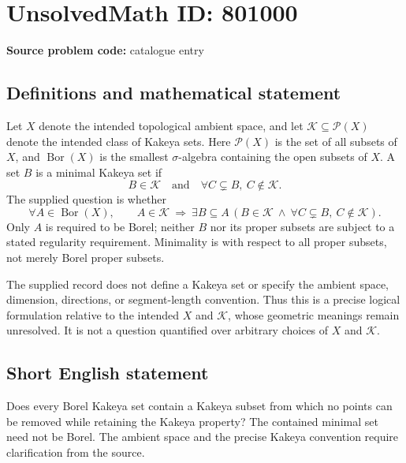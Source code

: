 \documentclass[11pt]{article}
\begin{document}
\section*{UnsolvedMath ID: 801000}
\textbf{Source problem code:} catalogue entry
\subsection{Definitions and mathematical statement}
Let \(X\) denote the intended topological ambient space, and let \(\mathcal K\subseteq\mathcal P(X)\) denote the intended class of Kakeya sets. Here \(\mathcal P(X)\) is the set of all subsets of \(X\), and \(\operatorname{Bor}(X)\) is the smallest \(\sigma\)-algebra containing the open subsets of \(X\). A set \(B\) is a minimal Kakeya set if
\[
B\in\mathcal K
\quad\text{and}\quad
\forall C\subsetneq B,\ C\notin\mathcal K.
\]
The supplied question is whether
\[
\forall A\in\operatorname{Bor}(X),\qquad
A\in\mathcal K\ \Longrightarrow\
\exists B\subseteq A\,
\left(B\in\mathcal K\ \land\
\forall C\subsetneq B,\ C\notin\mathcal K\right).
\]
Only \(A\) is required to be Borel; neither \(B\) nor its proper subsets are subject to a stated regularity requirement. Minimality is with respect to all proper subsets, not merely Borel proper subsets.

The supplied record does not define a Kakeya set or specify the ambient space, dimension, directions, or segment-length convention. Thus this is a precise logical formulation relative to the intended \(X\) and \(\mathcal K\), whose geometric meanings remain unresolved. It is not a question quantified over arbitrary choices of \(X\) and \(\mathcal K\).
\subsection{Short English statement}
Does every Borel Kakeya set contain a Kakeya subset from which no points can be removed while retaining the Kakeya property? The contained minimal set need not be Borel. The ambient space and the precise Kakeya convention require clarification from the source.
\end{document}
